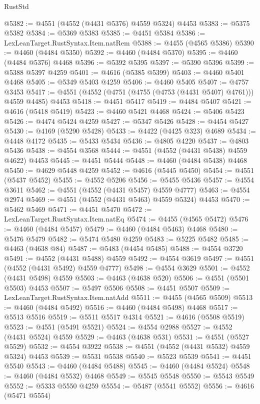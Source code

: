 \begin{lexlean}{RustStd}
\begin{coremodule}
@5382 := @4551 (@4552 (@4431 @5376) @4559 @5324) @4453
@5383 := @5375 @5382
@5384 := @5369 @5383
@5385 := @4451 @5384
@5386 := LexLeanTarget.RustSyntax.Item.natRem
@5388 := @4455 (@4565 @5386)
@5390 := @4460 (@4484 @5350)
@5392 := @4460 (@4484 @5370)
@5395 := @4460 (@4484 @5376) @4468
@5396 := @5392 @5395
@5397 := @5390 @5396
@5399 := @5388 @5397 @4259
@5401 := @4616 (@5385 @5399)
@5403 := @4460 @5401 @4468
@5405 := @5349 @5403 @4259
@5406 := @4460 @5405
@5407 := @4757 @3453
@5417 := @4551 (@4552 (@4751 (@4755 (@4753 (@4431 @5407) @4761))) @4559 @4485) @4453
@5418 := @4451 @5417
@5419 := @4484 @5407
@5421 := @4616 (@5418 @5419)
@5423 := @4460 @5421 @4468
@5424 := @5406 @5423
@5426 := @4474 @5424 @4259
@5427 := @5347 @5426
@5428 := @4454 @5427
@5430 := @4169 (@5290 @5428)
@5433 := @4422 (@4425 @323) @4689
@5434 := @4448 @4172
@5435 := @5433 @5434
@5436 := @4805 @4220
@5437 := @4803 @5436
@5438 := @4554 @3568
@5444 := @4551 (@4552 (@4431 @5438) @4559 @4622) @4453
@5445 := @4451 @5444
@5448 := @4460 (@4484 @5438) @4468
@5450 := @4629 @5448 @4259
@5452 := @4616 (@5445 @5450)
@5454 := @4551 (@5437 @5452)
@5455 := @4552 @5206
@5456 := @5455 @5436
@5457 := @4554 @3611
@5462 := @4551 (@4552 (@4431 @5457) @4559 @4777)
@5463 := @4554 @2974
@5469 := @4551 (@4552 (@4431 @5463) @4559 @5324) @4453
@5470 := @5462 @5469
@5471 := @4451 @5470
@5472 := LexLeanTarget.RustSyntax.Item.natEq
@5474 := @4455 (@4565 @5472)
@5476 := @4460 (@4484 @5457)
@5479 := @4460 (@4484 @5463) @4468
@5480 := @5476 @5479
@5482 := @5474 @5480 @4259
@5483 := @5225 @5482
@5485 := @4463 (@4638 @84)
@5487 := @5483 (@4454 @5485)
@5488 := @4554 @3720
@5491 := @4552 (@4431 @5488) @4559
@5492 := @4554 @3619
@5497 := @4551 (@4552 (@4431 @5492) @4559 @4777)
@5498 := @4554 @3629
@5501 := @4552 (@4431 @5498) @4559
@5503 := @4463 (@4638 @520)
@5506 := @4551 (@5501 @5503) @4453
@5507 := @5497 @5506
@5508 := @4451 @5507
@5509 := LexLeanTarget.RustSyntax.Item.natAdd
@5511 := @4455 (@4565 @5509)
@5513 := @4460 (@4484 @5492)
@5516 := @4460 (@4484 @5498) @4468
@5517 := @5513 @5516
@5519 := @5511 @5517 @4314
@5521 := @4616 (@5508 @5519)
@5523 := @4551 (@5491 @5521)
@5524 := @4554 @2988
@5527 := @4552 (@4431 @5524) @4559
@5529 := @4463 (@4638 @531)
@5531 := @4551 (@5527 @5529)
@5532 := @4554 @3922
@5538 := @4551 (@4552 (@4431 @5532) @4559 @5324) @4453
@5539 := @5531 @5538
@5540 := @5523 @5539
@5541 := @4451 @5540
@5543 := @4460 (@4484 @5488)
@5545 := @4460 (@4484 @5524)
@5548 := @4460 (@4484 @5532) @4468
@5549 := @5545 @5548
@5550 := @5543 @5549
@5552 := @5333 @5550 @4259
@5554 := @5487 (@5541 @5552)
@5556 := @4616 (@5471 @5554)

\end{coremodule}
\end{lexlean}
